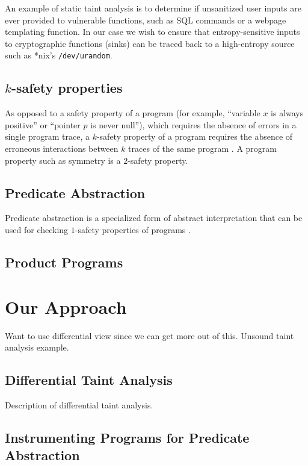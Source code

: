 \documentclass[letterpaper,twocolumn,10pt]{article}
\begin{document}
An example of static taint analysis is to determine if unsanitized user inputs are ever provided to vulnerable functions, such as SQL commands or
a webpage templating function. In our case we wish to ensure that entropy-sensitive inputs to cryptographic functions (sinks) can be
traced back to a high-entropy source such as *nix's \texttt{/dev/urandom}.

\subsection{$k$-safety properties}

As opposed to a safety property of a program (for example, ``variable $x$ is always positive'' or ``pointer $p$ is never null''), which requires
the absence of errors in a single program trace, a $k$-safety property of a program requires the absence of erroneous interactions between $k$
traces of the same program \cite{sousa2016cartesian}. A program property such as symmetry is a $2$-safety property.


\subsection{Predicate Abstraction}

Predicate abstraction is a specialized form of abstract interpretation that can be used for checking $1$-safety properties of programs
\cite{flanagan2002predicate}.


\subsection{Product Programs}

\section{Our Approach}

Want to use differential view since we can get more out of this. Unsound taint analysis example.

\subsection{Differential Taint Analysis}

Description of differential taint analysis.

\subsection{Instrumenting Programs for Predicate Abstraction}
\end{document}
